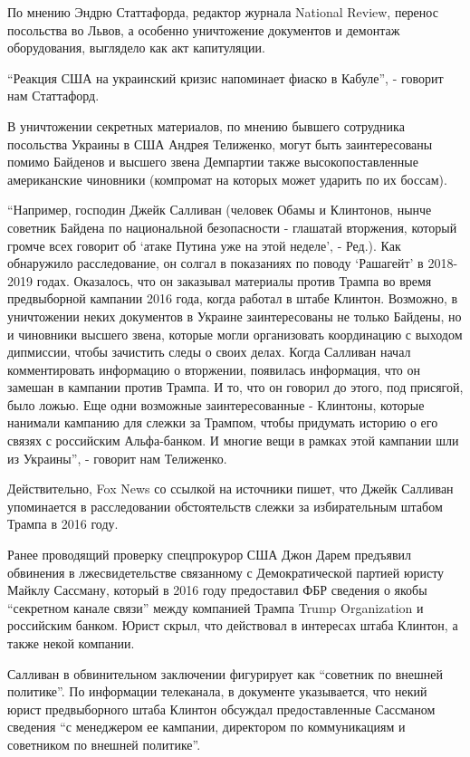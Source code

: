 По мнению Эндрю Статтафорда, редактор журнала National Review, перенос
посольства во Львов, а особенно уничтожение документов и демонтаж оборудования,
выглядело как акт капитуляции.

\enquote{Реакция США на украинский кризис напоминает фиаско в Кабуле}, -
говорит нам Статтафорд.

В уничтожении секретных материалов, по мнению бывшего сотрудника посольства
Украины в США Андрея Телиженко, могут быть заинтересованы помимо Байденов и
высшего звена Демпартии также высокопоставленные американские чиновники
(компромат на которых может ударить по их боссам).

\enquote{Например, господин Джейк Салливан (человек Обамы и Клинтонов, нынче советник
Байдена по национальной безопасности - глашатай вторжения, который громче всех
говорит об \enquote{атаке Путина уже на этой неделе}, - Ред.). Как обнаружило
расследование, он солгал в показаниях по поводу \enquote{Рашагейт} в 2018-2019 годах.
Оказалось, что он заказывал материалы против Трампа во время предвыборной
кампании 2016 года, когда работал в штабе Клинтон. Возможно, в уничтожении
неких документов в Украине заинтересованы не только Байдены, но и чиновники
высшего звена, которые могли организовать координацию с выходом дипмиссии,
чтобы зачистить следы о своих делах. Когда Салливан начал комментировать
информацию о вторжении, появилась информация, что он замешан в кампании против
Трампа. И то, что он говорил до этого, под присягой, было ложью. Еще одни
возможные заинтересованные - Клинтоны, которые нанимали кампанию для слежки за
Трампом, чтобы придумать историю о его связях с российским Альфа-банком. И
многие вещи в рамках этой кампании шли из Украины}, - говорит нам Телиженко.

Действительно, Fox News со ссылкой на источники пишет, что Джейк Салливан
упоминается в расследовании обстоятельств слежки за избирательным штабом Трампа
в 2016 году.

Ранее проводящий проверку спецпрокурор США Джон Дарем предъявил обвинения в
лжесвидетельстве связанному с Демократической партией юристу Майклу Сассману,
который в 2016 году предоставил ФБР сведения о якобы \enquote{секретном канале связи}
между компанией Трампа Trump Organization и российским банком. Юрист скрыл, что
действовал в интересах штаба Клинтон, а также некой компании.

Салливан в обвинительном заключении фигурирует как \enquote{советник по внешней
политике}. По информации телеканала, в документе указывается, что некий юрист
предвыборного штаба Клинтон обсуждал предоставленные Сассманом сведения \enquote{с
менеджером ее кампании, директором по коммуникациям и советником по внешней
политике}.

